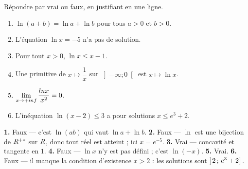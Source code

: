 \begin{jemeteste}
Répondre par vrai ou faux, en justifiant en une ligne.

\begin{enumerate}[label=\textbf{\arabic*.}, leftmargin=*, itemsep=0.28em]
  \item $\ln(a+b) = \ln a + \ln b$ pour tous $a>0$ et $b>0$.
  \item L'équation $\ln x = -5$ n'a pas de solution.
  \item Pour tout $x>0$, $\ln x \leq x-1$.
  \item Une primitive de $x \mapsto \dfrac{1}{x}$ sur $\left]-\infty;0\right[$
        est $x \mapsto \ln x$.
  \item $\limpinf \dfrac{\ln x}{x^{2}} = 0$.
  \item L'inéquation $\ln(x-2) \leq 3$ a pour solutions $x \leq e^{3}+2$.
\end{enumerate}
\end{jemeteste}

\begin{corrige}[je me teste]
\textbf{1.} Faux — c'est $\ln(ab)$ qui vaut $\ln a + \ln b$.
\textbf{2.} Faux — $\ln$ est une bijection de $R^{+*}$ sur $R$, donc tout réel
est atteint ; ici $x = e^{-5}$.
\textbf{3.} Vrai — concavité et tangente en $1$.
\textbf{4.} Faux — $\ln x$ n'y est pas défini ; c'est $\ln(-x)$.
\textbf{5.} Vrai.
\textbf{6.} Faux — il manque la condition d'existence $x>2$ : les solutions
sont $\left]2\,;\,e^{3}+2\right]$.
\end{corrige}

